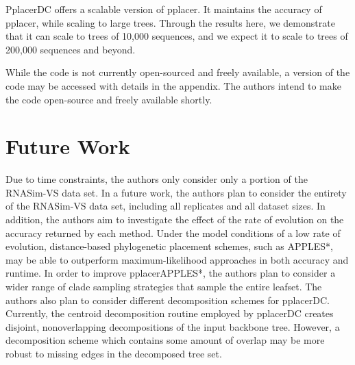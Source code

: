 \documentclass[10pt]{article}
\begin{document}
PplacerDC offers a scalable version of pplacer. It maintains the accuracy of pplacer, while scaling to large trees. Through the results here, we demonstrate that it can scale to trees of 10,000 sequences, and we expect it to scale to trees of 200,000 sequences and beyond.

While the code is not currently open-sourced and freely available, a version of the code
may be accessed with details in the appendix.
The authors intend to make the code open-source and freely available shortly.

\section{Future Work}

Due to time constraints, the authors only consider only a portion of the RNASim-VS data set.
In a future work, the authors plan to consider the entirety of the RNASim-VS data set, including all replicates and all dataset sizes.
In addition, the authors aim to investigate the effect of the rate of evolution on the accuracy
returned by each method.
Under the model conditions of a low rate of evolution, distance-based phylogenetic placement schemes,
such as APPLES*, may be able to outperform maximum-likelihood approaches in both accuracy and runtime.
In order to improve pplacerAPPLES*, the authors plan to consider a wider range of clade sampling
strategies that sample the entire leafset.
The authors also plan to consider different decomposition schemes for pplacerDC.
Currently, the centroid decomposition routine employed by pplacerDC creates disjoint, nonoverlapping
decompositions of the input backbone tree.
However, a decomposition scheme which contains some amount of overlap may be more robust to missing
edges in the decomposed tree set.



\end{document}
